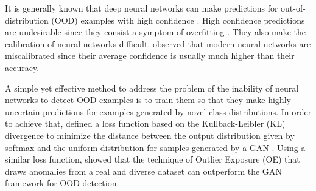 \documentclass{article} \usepackage{iclr2020_conference,times}
\begin{document}
It is generally known that deep neural networks can make predictions for out-of-distribution (OOD) examples with high confidence \citep{DBLP:conf/cvpr/NguyenYC15}. High confidence predictions are undesirable since they consist a symptom of overfitting \citep{DBLP:journals/corr/SzegedyVISW15}. They also make the calibration of neural networks difficult. \cite{Guo:2017:CMN:3305381.3305518} observed that modern neural networks are miscalibrated since their average confidence is usually much higher than their accuracy. 

A simple yet effective method to address the problem of the inability of neural networks to detect OOD examples is to train them so that they make highly uncertain predictions for examples generated by novel class distributions. In order to achieve that, \cite{2017arXiv171109325L} defined a loss function based on the Kullback-Leibler (KL) divergence to minimize the distance between the output distribution given by softmax and the uniform distribution for samples generated by a GAN \citep{Goodfellow:2014:GAN:2969033.2969125}. Using a similar loss function, \citet{hendrycks2019oe} showed that the technique of Outlier Exposure (OE) that draws anomalies from a real and diverse dataset can outperform the GAN framework for OOD detection. 
\end{document}
